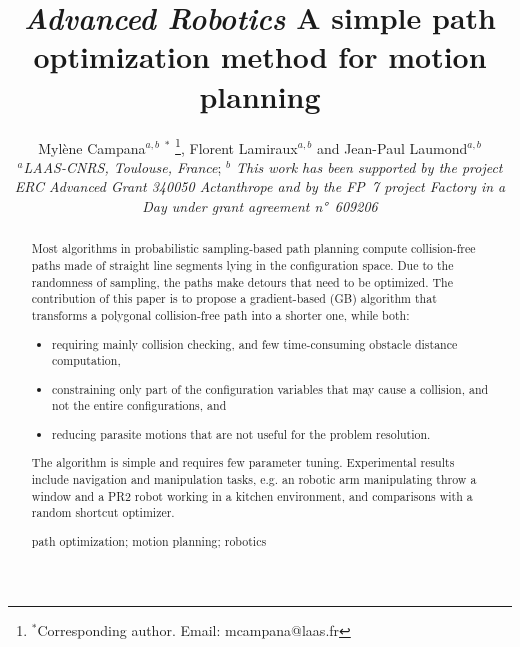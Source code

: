 \documentclass{tADR2e}
\begin{document}
\graphicspath{{images/}}

   

\title{{\itshape Advanced Robotics} A simple path optimization method for motion planning }	

\author{Myl\`{e}ne Campana$^{a,b}$ $^{\ast}$ \thanks{$^\ast$Corresponding author. Email: mcampana@laas.fr}, Florent Lamiraux$^{a,b}$ and Jean-Paul Laumond$^{a,b}$
\\\vspace{6pt}
$^{a}${\em{LAAS-CNRS, Toulouse, France}};
$^{b}${\em{ This work has been supported by the project ERC Advanced Grant 340050 Actanthrope and by the FP~7 project Factory in a Day under grant agreement n°~609206 }}
}
\maketitle

\begin{abstract}
Most algorithms in probabilistic sampling-based path planning compute 
collision-free paths made of straight line segments lying in the configuration 
space. Due
to the randomness of sampling, the paths make detours that need to be optimized.
The contribution of this paper is to propose a gradient-based (GB) algorithm that
transforms a polygonal collision-free path into a shorter one, while both:
\begin{itemize}
\item requiring mainly collision checking, and few time-consuming obstacle 
distance computation,
\item constraining only part of the configuration variables that may cause a 
collision, and not the entire configurations, and
\item reducing parasite motions that are not useful for the problem resolution.
\end{itemize}
The algorithm is simple and requires few parameter tuning. Experimental
results include navigation and manipulation tasks, e.g. an robotic arm 
manipulating throw a window and a PR2 robot working in a kitchen environment, 
and comparisons with a random shortcut optimizer.

\medskip

\begin{keywords}path optimization; motion planning; robotics
\end{keywords}\medskip

\end{abstract}
\end{document}
